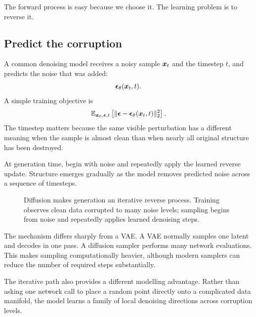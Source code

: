 The forward process is easy because we choose it. The learning problem is to reverse it.

\subsection{Predict the corruption}

A common denoising model receives a noisy sample \(\bm{x}_t\) and the timestep \(t\), and predicts the noise that was added:
\[
  \bm{\epsilon}_\theta(\bm{x}_t,t).
\]
A simple training objective is
\begin{equation}
  \mathbb{E}_{\bm{x}_0,\bm{\epsilon},t}
  \left[
    \|\bm{\epsilon}-\bm{\epsilon}_\theta(\bm{x}_t,t)\|_2^2
  \right].
  \label{eq:week8-diffusion-loss}
\end{equation}
The timestep matters because the same visible perturbation has a different meaning when the sample is almost clean than when nearly all original structure has been destroyed.

At generation time, begin with noise and repeatedly apply the learned reverse update. Structure emerges gradually as the model removes predicted noise across a sequence of timesteps.

\begin{figure}[ht]
  \caption{Diffusion makes generation an iterative reverse process. Training observes clean data corrupted to many noise levels; sampling begins from noise and repeatedly applies learned denoising steps.}
  \label{fig:week8-diffusion}
\end{figure}

The mechanism differs sharply from a VAE. A VAE normally samples one latent and decodes in one pass. A diffusion sampler performs many network evaluations. This makes sampling computationally heavier, although modern samplers can reduce the number of required steps substantially.

The iterative path also provides a different modelling advantage. Rather than asking one network call to place a random point directly onto a complicated data manifold, the model learns a family of local denoising directions across corruption levels.

